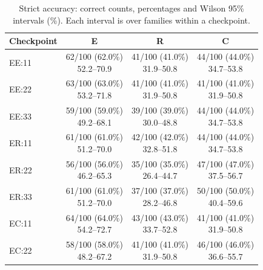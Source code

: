 \begin{table}[H]
\centering\small\singlespacing
\caption{Strict accuracy: correct counts, percentages and Wilson 95\% intervals (\%). Each interval is over families within a checkpoint.}
\label{tab:phase2-strict-accuracy}
\begin{tabular}{@{}lccc@{}}
\toprule
Checkpoint & E & R & C\\
\midrule
EE:11 & \makecell{62/100 (62.0\%)\\52.2--70.9} & \makecell{41/100 (41.0\%)\\31.9--50.8} & \makecell{44/100 (44.0\%)\\34.7--53.8}\\
EE:22 & \makecell{63/100 (63.0\%)\\53.2--71.8} & \makecell{41/100 (41.0\%)\\31.9--50.8} & \makecell{41/100 (41.0\%)\\31.9--50.8}\\
EE:33 & \makecell{59/100 (59.0\%)\\49.2--68.1} & \makecell{39/100 (39.0\%)\\30.0--48.8} & \makecell{44/100 (44.0\%)\\34.7--53.8}\\
ER:11 & \makecell{61/100 (61.0\%)\\51.2--70.0} & \makecell{42/100 (42.0\%)\\32.8--51.8} & \makecell{44/100 (44.0\%)\\34.7--53.8}\\
ER:22 & \makecell{56/100 (56.0\%)\\46.2--65.3} & \makecell{35/100 (35.0\%)\\26.4--44.7} & \makecell{47/100 (47.0\%)\\37.5--56.7}\\
ER:33 & \makecell{61/100 (61.0\%)\\51.2--70.0} & \makecell{37/100 (37.0\%)\\28.2--46.8} & \makecell{50/100 (50.0\%)\\40.4--59.6}\\
EC:11 & \makecell{64/100 (64.0\%)\\54.2--72.7} & \makecell{43/100 (43.0\%)\\33.7--52.8} & \makecell{41/100 (41.0\%)\\31.9--50.8}\\
EC:22 & \makecell{58/100 (58.0\%)\\48.2--67.2} & \makecell{41/100 (41.0\%)\\31.9--50.8} & \makecell{46/100 (46.0\%)\\36.6--55.7}\\

\end{tabular}
\end{table}
